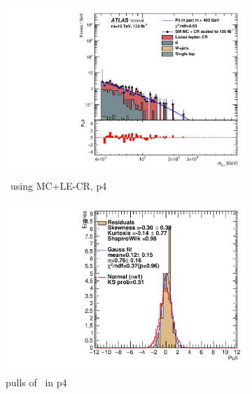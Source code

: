 \newpage

\begin{figure}[ht]
    \centering
    \begin{subfigure}[h]{0.38\linewidth}
    \includegraphics[scale=0.3]{figs/ch6/fit/variable_nosmooth/p4/01PB/output_SMMCplusCR_Mbg_p4.pdf}%
    \caption{\mbph \ using MC+LE-CR, p4}
    \end{subfigure}
    \hfill
    \begin{subfigure}[h]{0.4\linewidth}
    \includegraphics[scale=0.32]{figs/ch6/fit/variable_nosmooth/p4/01PB/pull_SMMCplusCR_Mbg_p4.pdf}%
    \caption{pulls of \mbph \ in p4}
    \end{subfigure}
    \hfill
    \begin{subfigure}[h]{0.38\linewidth}

\end{subfigure}
\end{figure}
